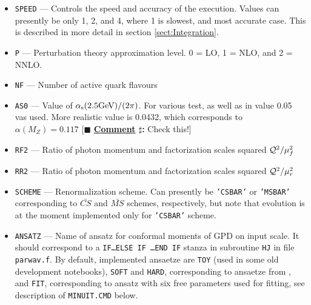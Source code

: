 \documentclass[12pt]{article}
\newcounter{comment}
\newcommand{\comminline}[1]{{%
\refstepcounter{comment}%
\ttfamily\small[$\blacksquare$ \textbf{\underline{Comment}
$\sharp$\thecomment:} #1]}}
\begin{document}
\begin{itemize}
\item
\texttt{SPEED} --- Controls the speed and accuracy of the execution. Values can
presently be only 1, 2, and 4, where 1 is slowest, and most accurate case.
This is described in more detail in section \ref{sect:Integration}.

\item
\texttt{P} --- Perturbation theory approximation level. 0 = LO, 1 = NLO, and
  2 = NNLO.

\item
\texttt{NF} --- Number of active quark flavours

\item
\texttt{AS0} --- Value of $\alpha_{\rm s}(2.5 \textrm{GeV})/(2 \pi)$. For various
test, as well as in \cite{Kumericki:2006xx} value 0.05 vas used. More realistic
value is 0.0432, which corresponds to $\alpha(M_Z) = 0.117$ \comminline{Check this!}

\item
\texttt{RF2} --- Ratio of photon momentum and factorization scales squared
 $ {\cal Q}^2/{\mu_{f}^2}$

\item
\texttt{RR2} --- Ratio of photon momentum and factorization scales squared
 $ {\cal Q}^2/{\mu_{r}^2}$

\item
\texttt{SCHEME} --- Renormalization scheme. Can presently be \texttt{'CSBAR'} or
\texttt{'MSBAR'} corresponding to $\bar{CS}$ and $\bar{MS}$ schemes, respectively,
but note that evolution is at the moment implemented only for \texttt{'CSBAR'} scheme.

\item
\texttt{ANSATZ} --- Name of ansatz for conformal moments of GPD on input scale. It
should correspond to a  \texttt{IF\ldots ELSE IF \ldots END IF} stanza in subroutine
\texttt{HJ} in file \texttt{parwav.f}. By default, implemented ansaetze are
\texttt{TOY} (used in some old development notebooks), \texttt{SOFT} and \texttt{HARD},
corresponding to ansaetze from \cite{Kumericki:2006xx}, and \texttt{FIT}, corresponding
to ansatz with six free parameters used for fitting, see description of 
\texttt{MINUIT.CMD} below.

\end{itemize}

%

%

\end{document}
